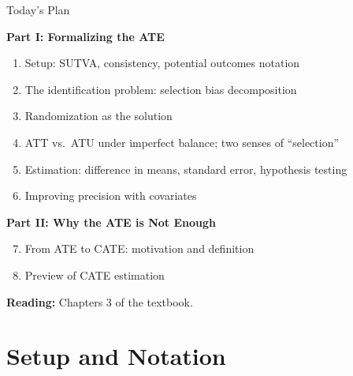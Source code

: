 \documentclass[aspectratio=169, 11pt, handout]{beamer}
\begin{document}
\begin{frame}{Today's Plan}

\textbf{Part I: Formalizing the ATE}
\begin{enumerate}
    \item Setup: SUTVA, consistency, potential outcomes notation
    \item The identification problem: selection bias decomposition
    \item Randomization as the solution
    \item ATT vs.\ ATU under imperfect balance; two senses of ``selection''
    \item Estimation: difference in means, standard error, hypothesis testing
    \item Improving precision with covariates
\end{enumerate}

\bigskip

\textbf{Part II: Why the ATE is Not Enough}
\begin{enumerate}
    \setcounter{enumi}{6}
    \item From ATE to CATE: motivation and definition
    \item Preview of CATE estimation
\end{enumerate}

\bigskip
\textbf{Reading:} Chapters 3 of the textbook.
\end{frame}

\section{Setup and Notation}
\end{document}
